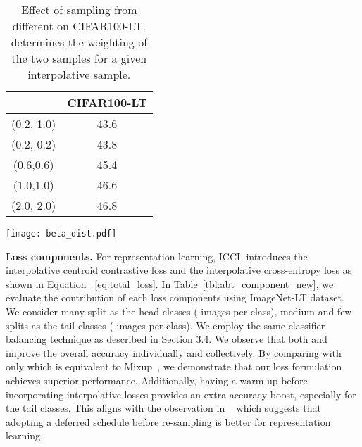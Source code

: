  \begin{table}[!t]
	\begin{minipage}[b]{0.5\linewidth}
		\centering
			\begin{tabular}	{c |c }
			\hline	 	 
			  &    CIFAR100-LT \\
		\hline	 
			(0.2, 1.0)			& 43.6 \\
			(0.2, 0.2)			& 43.8\\
			(0.6,0.6) 		&   45.4\\
			(1.0,1.0)		&     46.6\\
			(2.0, 2.0) 		&   46.8\\
		\hline	 
			\end{tabular}

	\end{minipage}\hfill
	\begin{minipage}[!b]{0.44\linewidth}
		\centering
		\texttt{[image: beta\_dist.pdf]}

	\end{minipage}
	\vspace{-2.3ex}
	\caption
		{\small	
		Effect of sampling  from different  on CIFAR100-LT.
		 determines the weighting of the two samples for a given interpolative sample.  
		}
    \label{tbl:lambda}
\vspace{-2.5ex}
\end{table}
 
\textbf{Loss components.}
For representation learning, ICCL introduces the interpolative centroid contrastive loss  and 
the interpolative cross-entropy loss  as shown in Equation ~\ref{eq:total_loss}. 
In Table~\ref{tbl:abt_component_new},
we evaluate the contribution of each loss components using ImageNet-LT dataset.
We consider many split as the head classes ( images per class), medium and few splits as the tail classes ( images per class).
We employ the same classifier balancing technique as described in Section 3.4.
We observe that both  and  improve the overall accuracy individually and collectively. 
By comparing with  only which is equivalent to Mixup~\cite{mixup}, we demonstrate that our loss formulation achieves superior performance.
Additionally, having a warm-up before incorporating interpolative losses provides an extra accuracy boost, especially for the tail classes. 
This aligns with the observation 
in ~\cite{ldam} which suggests that adopting a deferred schedule before re-sampling is better for representation learning.


